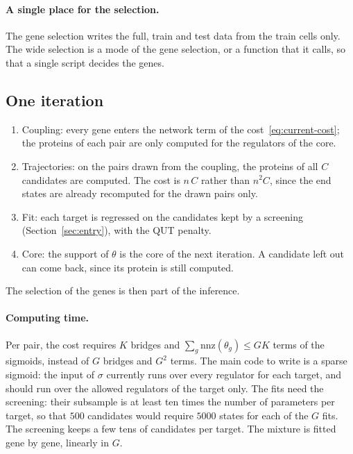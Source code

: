 \documentclass[a4paper, 11pt]{article}
\newcommand{\nnz}{\mathrm{nnz}}
\theoremstyle{plain}
\theoremstyle{remark}
\begin{document}
\paragraph{A single place for the selection.} The gene selection writes the full, train and test data from the train cells only. The wide selection is a mode of the gene selection, or a function that it calls, so that a single script decides the genes.

\subsection{One iteration}\label{sec:iteration}

\begin{enumerate}[nosep]
\item Coupling: every gene enters the network term of the cost~\eqref{eq:current-cost}; the proteins of each pair are only computed for the regulators of the core.
\item Trajectories: on the pairs drawn from the coupling, the proteins of all $C$ candidates are computed. The cost is $n\,C$ rather than $n^2 C$, since the end states are already recomputed for the drawn pairs only.
\item Fit: each target is regressed on the candidates kept by a screening (Section~\ref{sec:entry}), with the QUT penalty.
\item Core: the support of $\theta$ is the core of the next iteration. A candidate left out can come back, since its protein is still computed.
\end{enumerate}
The selection of the genes is then part of the inference.

\paragraph{Computing time.} Per pair, the cost requires $K$ bridges and $\sum_g \nnz(\theta_g) \le GK$ terms of the sigmoids, instead of $G$ bridges and $G^2$ terms. The main code to write is a sparse sigmoid: the input of $\sigma$ currently runs over every regulator for each target, and should run over the allowed regulators of the target only. The fits need the screening: their subsample is at least ten times the number of parameters per target, so that $500$ candidates would require $5000$ states for each of the $G$ fits. The screening keeps a few tens of candidates per target. The mixture is fitted gene by gene, linearly in $G$.
\end{document}
